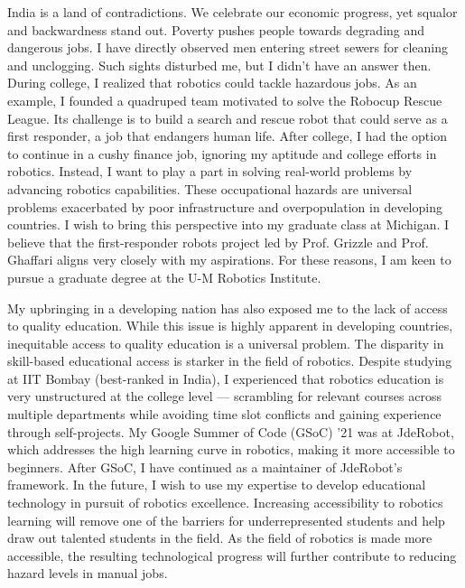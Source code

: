\documentclass[12pt]{article}
\begin{document}
	
%		

\vspace*{-.3in}


India is a land of contradictions. We celebrate our economic progress, yet squalor and backwardness stand out. Poverty pushes people towards degrading and dangerous jobs. I have directly observed men entering street sewers for cleaning and unclogging. Such sights disturbed me, but I didn’t have an answer then. During college, I realized that robotics could tackle hazardous jobs. As an example, I founded a quadruped team motivated to solve the Robocup Rescue League. Its challenge is to build a search and rescue robot that could serve as a first responder, a job that endangers human life. After college, I had the option to continue in a cushy finance job, ignoring my aptitude and college efforts in robotics. Instead, I want to play a part in solving real-world problems by advancing robotics capabilities. These occupational hazards are universal problems exacerbated by poor infrastructure and overpopulation in developing countries. I wish to bring this perspective into my graduate class at Michigan. I believe that the first-responder robots project led by Prof. Grizzle and Prof. Ghaffari aligns very closely with my aspirations. For these reasons, I am keen to pursue a graduate degree at the U-M Robotics Institute.

My upbringing in a developing nation has also exposed me to the lack of access to quality education. While this issue is highly apparent in developing countries, inequitable access to quality education is a universal problem. The disparity in skill-based educational access is starker in the field of robotics. Despite studying at IIT Bombay (best-ranked in India), I experienced that robotics education is very unstructured at the college level — scrambling for relevant courses across multiple departments while avoiding time slot conflicts and gaining experience through self-projects. My Google Summer of Code (GSoC) ’21 was at JdeRobot, which addresses the high learning curve in robotics, making it more accessible to beginners. After GSoC, I have continued as a maintainer of JdeRobot’s framework. In the future, I wish to use my expertise to develop educational technology in pursuit of robotics excellence. Increasing accessibility to robotics learning will remove one of the barriers for underrepresented students and help draw out talented students in the field. As the field of robotics is made more accessible, the resulting technological progress will further contribute to reducing hazard levels in manual jobs.
\end{document}
